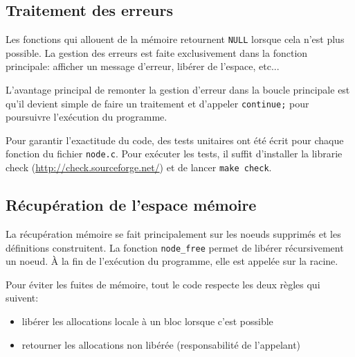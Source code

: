 \documentclass{article}
\begin{document}
\subsection{Traitement des erreurs}
Les fonctions qui allouent de la mémoire retournent \texttt{NULL} lorsque cela
n'est plus possible. La gestion des erreurs est faite exclusivement dans la
fonction principale: afficher un message d'erreur, libérer de l'espace, etc...

L'avantage principal de remonter la gestion d'erreur dans la boucle principale
est qu'il devient simple de faire un traitement et d'appeler \texttt{continue;}
pour poursuivre l'exécution du programme.

Pour garantir l'exactitude du code, des tests unitaires ont été écrit pour
chaque fonction du fichier \texttt{node.c}. Pour exécuter les tests, il suffit
d'installer la librarie check (\url{http://check.sourceforge.net/}) et de lancer
\texttt{make check}.

\subsection{Récupération de l'espace mémoire}
La récupération mémoire se fait principalement sur les noeuds supprimés et les
définitions construitent. La fonction \texttt{node\_free} permet de libérer
récursivement un noeud. À la fin de l'exécution du programme, elle est appelée
sur la racine.

Pour éviter les fuites de mémoire, tout le code respecte les deux règles qui
suivent:
\begin{itemize}
\item libérer les allocations locale à un bloc lorsque c'est possible
\item retourner les allocations non libérée (responsabilité de l'appelant)
\end{itemize}
\end{document}
